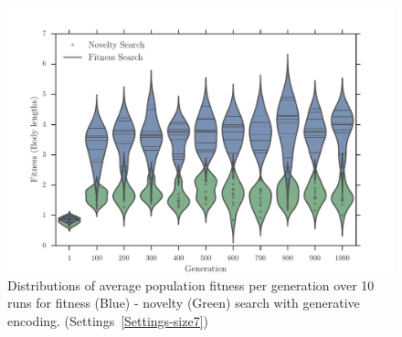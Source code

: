 \begin{figure}[t!]
\centering
\includegraphics[width=1.0\textwidth]{../Figures/Results/ViolinPlotsAvgGenFitSize7.pdf}
\caption{Distributions of average population fitness per generation over 10 runs for fitness (Blue) - novelty (Green) search with generative encoding. (Settings~\ref{Settings-size7})}
\label{fig:ViolinPlotsAvgGenFitSize7}
\end{figure}

